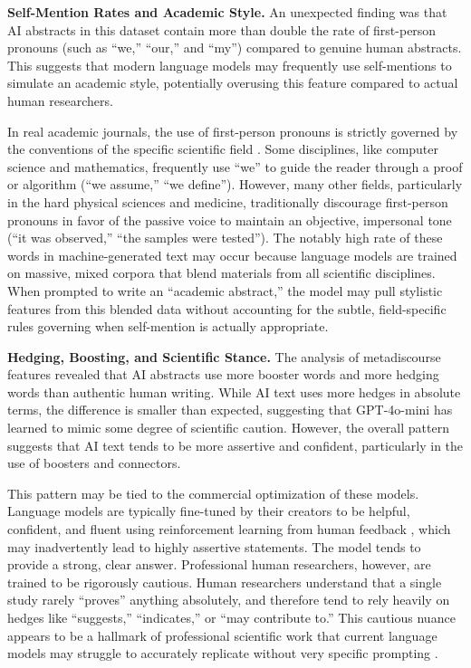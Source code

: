 \documentclass{article}
\begin{document}
\textbf{Self-Mention Rates and Academic Style.} An unexpected finding was that AI abstracts in this dataset contain more than double the rate of first-person pronouns (such as ``we,'' ``our,'' and ``my'') compared to genuine human abstracts. This suggests that modern language models may frequently use self-mentions to simulate an academic style, potentially overusing this feature compared to actual human researchers.

In real academic journals, the use of first-person pronouns is strictly governed by the conventions of the specific scientific field \cite{ref2}. Some disciplines, like computer science and mathematics, frequently use ``we'' to guide the reader through a proof or algorithm (``we assume,'' ``we define''). However, many other fields, particularly in the hard physical sciences and medicine, traditionally discourage first-person pronouns in favor of the passive voice to maintain an objective, impersonal tone (``it was observed,'' ``the samples were tested''). The notably high rate of these words in machine-generated text may occur because language models are trained on massive, mixed corpora that blend materials from all scientific disciplines. When prompted to write an ``academic abstract,'' the model may pull stylistic features from this blended data without accounting for the subtle, field-specific rules governing when self-mention is actually appropriate.

\textbf{Hedging, Boosting, and Scientific Stance.} The analysis of metadiscourse features revealed that AI abstracts use more booster words and more hedging words than authentic human writing. While AI text uses more hedges in absolute terms, the difference is smaller than expected, suggesting that GPT-4o-mini has learned to mimic some degree of scientific caution. However, the overall pattern suggests that AI text tends to be more assertive and confident, particularly in the use of boosters and connectors.

This pattern may be tied to the commercial optimization of these models. Language models are typically fine-tuned by their creators to be helpful, confident, and fluent using reinforcement learning from human feedback \cite{ref17}, which may inadvertently lead to highly assertive statements. The model tends to provide a strong, clear answer. Professional human researchers, however, are trained to be rigorously cautious. Human researchers understand that a single study rarely ``proves'' anything absolutely, and therefore tend to rely heavily on hedges like ``suggests,'' ``indicates,'' or ``may contribute to.'' This cautious nuance appears to be a hallmark of professional scientific work that current language models may struggle to accurately replicate without very specific prompting \cite{ref5}.
\end{document}
